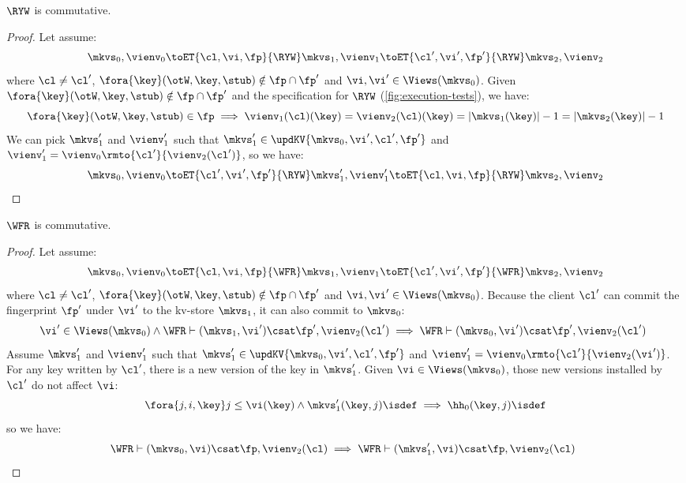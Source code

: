 \begin{lemma}
    \label{lem:ryw-comm}
    \(\RYW\) is commutative.
\end{lemma}
\begin{proof}
    Let assume:
    \[
        \mkvs_0, \vienv_0 \toET{\cl, \vi, \fp}{\RYW} \mkvs_1, \vienv_1 \toET{\cl', \vi', \fp'}{\RYW} \mkvs_2, \vienv_2 
    \]
    where \( \cl \neq \cl' \), \( \fora{ \key } (\otW, \key, \stub) \notin \fp \cap \fp' \) and \( \vi, \vi' \in \Views(\mkvs_0)\).
    Given \( \fora{ \key } (\otW, \key, \stub) \notin \fp \cap \fp' \) and the specification for \( \RYW \) (\cref{fig:execution-tests}), we have:
    \[
        \fora{\key} (\otW, \key, \stub) \in \fp \implies \vienv_1(\cl)(\key) = \vienv_2(\cl)(\key) = \lvert \mkvs_1(\key) \rvert - 1 = \lvert \mkvs_2(\key) \rvert - 1
    \]
    We can pick \( \mkvs'_1 \) and \( \vienv'_1 \) such that \( \mkvs'_1 \in \updKV{\mkvs_0,\vi',\cl',\fp'} \) and \( \vienv'_1 = \vienv_0\rmto{\cl'}{\vienv_2(\cl')} \), so we have:
    \[
        \mkvs_0, \vienv_0 \toET{\cl', \vi', \fp'}{\RYW} \mkvs'_1, \vienv'_1 \toET{\cl, \vi, \fp}{\RYW} \mkvs_2, \vienv_2 
    \]
\end{proof}

\begin{lemma}
    \label{lem:wfr-comm}
    \(\WFR\) is commutative.
\end{lemma}
\begin{proof}
    Let assume:
    \[
        \mkvs_0, \vienv_0 \toET{\cl, \vi, \fp}{\WFR} \mkvs_1, \vienv_1 \toET{\cl', \vi', \fp'}{\WFR} \mkvs_2, \vienv_2 
    \]
    where \( \cl \neq \cl' \), \( \fora{ \key } (\otW, \key, \stub) \notin \fp \cap \fp' \) and \( \vi, \vi' \in \Views(\mkvs_0)\).
    Because the client \( \cl' \) can commit the fingerprint \( \fp' \) under \( \vi' \) to the kv-store \( \mkvs_1 \), it can also commit to \( \mkvs_0 \):
    \[
        \begin{array}{@{}l}
            \vi' \in \Views(\mkvs_0) \land \WFR \vdash (\mkvs_1, \vi') \csat \fp', \vienv_2(\cl') \implies  \WFR \vdash (\mkvs_0, \vi') \csat \fp', \vienv_2(\cl')
        \end{array}
    \]
    Assume \( \mkvs'_1 \) and \( \vienv'_1 \) such that \( \mkvs'_1 \in \updKV{\mkvs_0,\vi',\cl',\fp'} \) and \( \vienv'_1 = \vienv_0\rmto{\cl'}{\vienv_2(\vi')} \).
    For any key written by \( \cl' \), there is a new version of the key in \( \mkvs'_1 \).
    Given \( \vi \in \Views(\mkvs_0)\), those new versions installed by \( \cl' \) do not affect \( \vi \):
    \[
        \fora{j,i, \key} j \leq \vi(\key) \land \mkvs'_1(\key, j)\isdef \implies \hh_0(\key, j)\isdef
    \]
    so we have:
    \[
        \begin{array}{@{}l}
            \WFR \vdash (\mkvs_0, \vi) \csat \fp, \vienv_2(\cl) \implies \WFR \vdash (\mkvs'_1, \vi) \csat \fp, \vienv_2(\cl)
        \end{array}
    \]
\end{proof}

